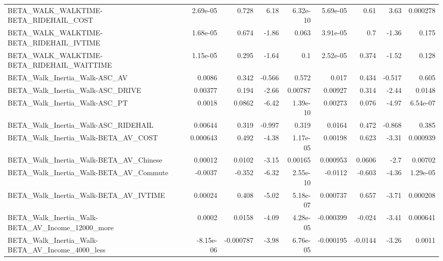 \begin{tabular}{lrrrrrrrr}
BETA\_WALK\_WALKTIME-BETA\_RIDEHAIL\_COST              &    2.69e-05 &        0.728 &     6.18 & 6.32e-10 &   5.69e-05 &        0.61 &         3.63 &      0.000278 \\
BETA\_WALK\_WALKTIME-BETA\_RIDEHAIL\_IVTIME            &    1.68e-05 &        0.674 &    -1.86 &    0.063 &   3.91e-05 &         0.7 &        -1.36 &         0.175 \\
BETA\_WALK\_WALKTIME-BETA\_RIDEHAIL\_WAITTIME          &    1.15e-05 &        0.295 &    -1.64 &      0.1 &   2.52e-05 &       0.374 &        -1.52 &         0.128 \\
BETA\_Walk\_Inertia\_Walk-ASC\_AV                      &      0.0086 &        0.342 &   -0.566 &    0.572 &      0.017 &       0.434 &       -0.517 &         0.605 \\
BETA\_Walk\_Inertia\_Walk-ASC\_DRIVE                   &     0.00377 &        0.194 &    -2.66 &  0.00787 &    0.00927 &       0.314 &        -2.44 &        0.0148 \\
BETA\_Walk\_Inertia\_Walk-ASC\_PT                      &      0.0018 &       0.0862 &    -6.42 & 1.39e-10 &    0.00273 &       0.076 &        -4.97 &      6.54e-07 \\
BETA\_Walk\_Inertia\_Walk-ASC\_RIDEHAIL                &     0.00644 &        0.319 &   -0.997 &    0.319 &     0.0164 &       0.472 &       -0.868 &         0.385 \\
BETA\_Walk\_Inertia\_Walk-BETA\_AV\_COST                &    0.000643 &        0.492 &    -4.38 & 1.17e-05 &    0.00198 &       0.623 &        -3.31 &      0.000939 \\
BETA\_Walk\_Inertia\_Walk-BETA\_AV\_Chinese             &     0.00012 &       0.0102 &    -3.15 &  0.00165 &   0.000953 &      0.0606 &         -2.7 &       0.00702 \\
BETA\_Walk\_Inertia\_Walk-BETA\_AV\_Commute             &     -0.0037 &       -0.352 &    -6.32 & 2.55e-10 &    -0.0112 &      -0.603 &        -4.36 &      1.29e-05 \\
BETA\_Walk\_Inertia\_Walk-BETA\_AV\_IVTIME              &     0.00024 &        0.408 &    -5.02 & 5.18e-07 &   0.000737 &       0.657 &        -3.71 &      0.000208 \\
BETA\_Walk\_Inertia\_Walk-BETA\_AV\_Income\_12000\_more   &      0.0002 &       0.0158 &    -4.09 & 4.28e-05 &  -0.000399 &      -0.024 &        -3.41 &      0.000641 \\
BETA\_Walk\_Inertia\_Walk-BETA\_AV\_Income\_4000\_less    &   -8.15e-06 &    -0.000787 &    -3.98 & 6.76e-05 &  -0.000195 &     -0.0144 &        -3.26 &        0.0011 \\

\end{tabular}
